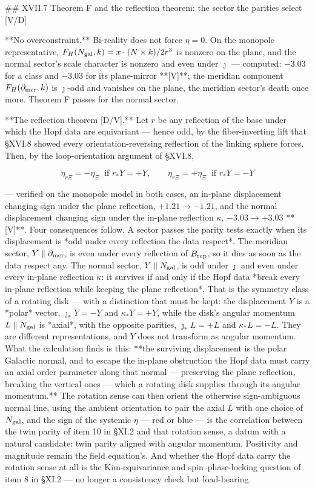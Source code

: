 ## XVII.7 Theorem F and the reflection theorem: the sector the parities select [V/D]

**No overconstraint.** Bi-reality does not force $\eta = 0$. On the monopole representative, $F_H(N_{\rm gal},k) = x\cdot(N\times k)/2r^3$ is nonzero on the plane, and the normal sector's scale character is nonzero and even under $\jmath$ — computed: $-3.03$ for a class and $-3.03$ for its plane-mirror **[V]**; the meridian component $F_H(\partial_{\rm mer},k)$ is $\jmath$-odd and vanishes on the plane, the meridian sector's death once more. Theorem F passes for the normal sector.

**The reflection theorem [D/V].** Let $r$ be any reflection of the base under which the Hopf data are equivariant — hence odd, by the fiber-inverting lift that §XVI.8 showed every orientation-reversing reflection of the linking sphere forces. Then, by the loop-orientation argument of §XVI.8,

$$\eta_{r\Xi} = -\eta_\Xi\ \text{ if } r_*Y = +Y,\qquad \eta_{r\Xi} = +\eta_\Xi\ \text{ if } r_*Y = -Y$$

— verified on the monopole model in both cases, an in-plane displacement changing sign under the plane reflection, $+1.21\to-1.21$, and the normal displacement changing sign under the in-plane reflection $\kappa$, $-3.03\to+3.03$ **[V]**. Four consequences follow. A sector passes the parity tests exactly when its displacement is *odd under every reflection the data respect*. The meridian sector, $Y\parallel\partial_{\rm mer}$, is even under every reflection of $B_{\rm rep}$, so it dies as soon as the data respect any. The normal sector, $Y\parallel N_{\rm gal}$, is odd under $\jmath$ and even under every in-plane reflection $\kappa$: it survives if and only if the Hopf data *break every in-plane reflection while keeping the plane reflection*. That is the symmetry class of a rotating disk — with a distinction that must be kept: the displacement $Y$ is a *polar* vector, $\jmath_*Y = -Y$ and $\kappa_*Y = +Y$, while the disk's angular momentum $L\parallel N_{\rm gal}$ is *axial*, with the opposite parities, $\jmath_*L = +L$ and $\kappa_*L = -L$. They are different representations, and $Y$ does not transform as angular momentum. What the calculation finds is this: **the surviving displacement is the polar Galactic normal, and to escape the in-plane obstruction the Hopf data must carry an axial order parameter along that normal — preserving the plane reflection, breaking the vertical ones — which a rotating disk supplies through its angular momentum.** The rotation sense can then orient the otherwise sign-ambiguous normal line, using the ambient orientation to pair the axial $L$ with one choice of $N_{\rm gal}$, and the sign of the systemic $\eta$ — red or blue — is the correlation between the twin parity of item 10 in §XI.2 and that rotation sense, a datum with a natural candidate: twin parity aligned with angular momentum. Positivity and magnitude remain the field equation's. And whether the Hopf data carry the rotation sense at all is the Kim-equivariance and spin–phase-locking question of item 8 in §XI.2 — no longer a consistency check but load-bearing.

